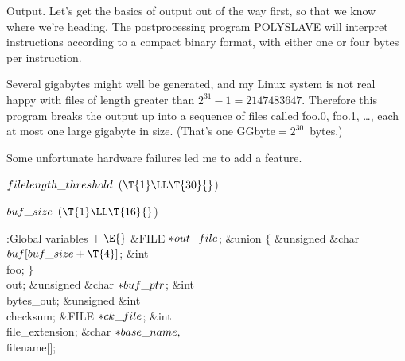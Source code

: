 Output. Let's get the basics of output out of the way first, so that
we know where we're heading. The postprocessing program {\mc POLYSLAVE}
will interpret instructions according to a compact binary format,
with either one or four bytes per instruction.

Several gigabytes might well be generated,
and my Linux system is not real happy with files of length greater than
$2^{31}-1=2147483647$. Therefore this program breaks the output up
into a sequence of files called \.{foo.0}, \.{foo.1}, \dots, each
at most one large gigabyte in size. (That's one GGbyte${}=2^{30}$~bytes.)

Some unfortunate hardware failures led me to add a  feature.

\Y\B\4\D$\\{filelength\_threshold}$ \5
$(\T{1}\LL\T{30}{}$)\par
\B\4\D$\\{buf\_size}$ \5
$(\T{1}\LL\T{16}{}$)\par
\Y\B\4:Global variables\X${}\mathrel+\E{}$\6
\&{FILE} ${}{*}\\{out\_file}{}$;\6
\&{union} ${}\{{}$\1\6
\&{unsigned} \&{char} ${}\\{buf}[\\{buf\_size}+\T{4}]{}$;\6
\&{int} \\{foo};\2\6
${}\}{}$ \\{out};\6
\&{unsigned} \&{char} ${}{*}\\{buf\_ptr}{}$;\6
\&{int} \\{bytes\_out};\6
\&{unsigned} \&{int} \\{checksum};\6
\&{FILE} ${}{*}\\{ck\_file}{}$;\6
\&{int} \\{file\_extension};\6
\&{char} ${}{*}\\{base\_name},{}$ \\{filename}[];\par
\fi

